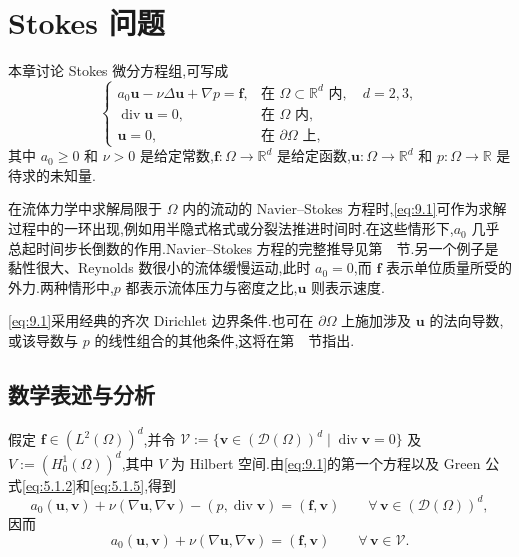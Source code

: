 \chapter{Stokes 问题}\label{ch:9}

本章讨论 Stokes 微分方程组,可写成
\begin{equation}\tag{9.1}\label{eq:9.1}
  \begin{cases}
    a_0\boldsymbol{u}-\nu\Delta\boldsymbol{u}+\nabla p=\boldsymbol{f},
      &\text{在 }\Omega\subset\mathbb R^d\text{ 内},\quad d=2,3,\\
    \operatorname{div}\boldsymbol{u}=0,&\text{在 }\Omega\text{ 内},\\
    \boldsymbol{u}=0,&\text{在 }\partial\Omega\text{ 上},
  \end{cases}
\end{equation}
其中 \(a_0\ge0\) 和 \(\nu>0\) 是给定常数,\(\boldsymbol{f}\colon\Omega\to\mathbb R^d\) 是给定函数,\(\boldsymbol{u}\colon\Omega\to\mathbb R^d\) 和 \(p\colon\Omega\to\mathbb R\) 是待求的未知量.

在流体力学中求解局限于 \(\Omega\) 内的流动的 Navier--Stokes 方程时,\eqref{eq:9.1}可作为求解过程中的一环出现,例如用半隐式格式或分裂法推进时间时.在这些情形下,\(a_0\) 几乎总起时间步长倒数的作用.Navier--Stokes 方程的完整推导见第~~节.另一个例子是黏性很大、Reynolds 数很小的流体缓慢运动,此时 \(a_0=0\),而 \(\boldsymbol{f}\) 表示单位质量所受的外力.两种情形中,\(p\) 都表示流体压力与密度之比,\(\boldsymbol{u}\) 则表示速度.

\eqref{eq:9.1}采用经典的齐次 Dirichlet 边界条件.也可在 \(\partial\Omega\) 上施加涉及 \(\boldsymbol{u}\) 的法向导数,或该导数与 \(p\) 的线性组合的其他条件,这将在第~~节指出.

\section{数学表述与分析}\label{sec:9.1}

假定 \(\boldsymbol{f}\in(L^2(\Omega))^d\),并令
\(\mathcal V:=\{\boldsymbol{v}\in(\mathcal D(\Omega))^d\mid\operatorname{div}\boldsymbol{v}=0\}\)
及 \(V:=(H_0^1(\Omega))^d\),其中 \(V\) 为 Hilbert 空间.由\eqref{eq:9.1}的第一个方程以及 Green 公式\eqref{eq:5.1.2}和\eqref{eq:5.1.5},得到
\begin{equation}\label{eq:9.1.1}
  a_0(\boldsymbol{u},\boldsymbol{v})+\nu(\nabla\boldsymbol{u},\nabla\boldsymbol{v})
      -(p,\operatorname{div}\boldsymbol{v})=(\boldsymbol{f},\boldsymbol{v})
      \qquad\forall\,\boldsymbol{v}\in(\mathcal D(\Omega))^d,
\end{equation}
因而
\begin{equation}\label{eq:9.1.2}
  a_0(\boldsymbol{u},\boldsymbol{v})+\nu(\nabla\boldsymbol{u},\nabla\boldsymbol{v})
      =(\boldsymbol{f},\boldsymbol{v})\qquad\forall\,\boldsymbol{v}\in\mathcal V.
\end{equation}

